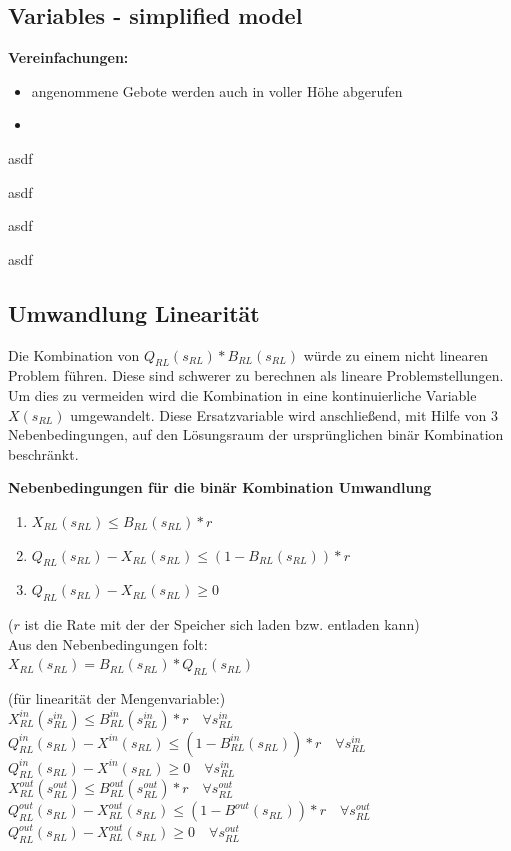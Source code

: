 \subsection{Variables - simplified model}
\textbf{Vereinfachungen:}



\begin{itemize}
    \item angenommene Gebote werden auch in voller Höhe abgerufen
    \item 
\end{itemize}

asdf


asdf


asdf


asdf
\subsection{Umwandlung Linearität}
Die Kombination von $Q_{RL}(s_{RL}) * B_{RL}(s_{RL})$ würde zu einem nicht linearen Problem führen. Diese sind schwerer zu berechnen als lineare Problemstellungen. Um dies zu vermeiden wird die Kombination in eine kontinuierliche Variable $X(s_{RL})$ umgewandelt. Diese Ersatzvariable wird anschließend, mit Hilfe von 3 Nebenbedingungen, auf den Lösungsraum der ursprünglichen binär Kombination beschränkt.

\textbf{Nebenbedingungen für die binär Kombination Umwandlung}
\begin{enumerate}
    \item $X_{RL}(s_{RL}) \leq B_{RL}(s_{RL}) * r$
    \item $Q_{RL}(s_{RL}) - X_{RL}(s_{RL}) \leq (1 - B_{RL}(s_{RL})) * r $
    \item $Q_{RL}(s_{RL}) - X_{RL}(s_{RL}) \geq 0 $
\end{enumerate}
($r$ ist die Rate mit der der Speicher sich laden bzw. entladen kann)\\
Aus den Nebenbedingungen folt:\\

$X_{RL}(s_{RL}) = B_{RL}(s_{RL}) * Q_{RL}(s_{RL}) $

(für linearität der Mengenvariable:)\\
$X^{in}_{RL}(s^{in}_{RL}) \leq B^{in}_{RL}(s^{in}_{RL}) * r \quad\forall s^{in}_{RL}$\\
$Q^{in}_{RL}(s_{RL}) - X^{in}(s_{RL}) \leq (1 - B^{in}_{RL}(s_{RL})) * r \quad\forall s^{in}_{RL}$\\
$Q^{in}_{RL}(s_{RL}) - X^{in}(s_{RL}) \geq 0 \quad\forall s^{in}_{RL}$\\
$X^{out}_{RL}(s^{out}_{RL}) \leq B^{out}_{RL}(s^{out}_{RL}) * r \quad\forall s^{out}_{RL}$\\
$Q^{out}_{RL}(s_{RL}) - X^{out}_{RL}(s_{RL}) \leq (1 - B^{out}(s_{RL})) * r \quad\forall s^{out}_{RL}$\\
$Q^{out}_{RL}(s_{RL}) - X^{out}_{RL}(s_{RL}) \geq 0\quad\forall s^{out}_{RL} $\\





